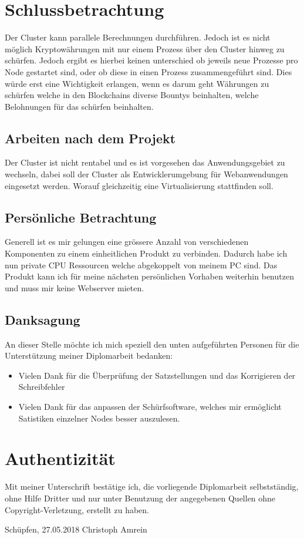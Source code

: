 \section{Schlussbetrachtung} 
\label{sec:Schlussbetrachtung}
Der Cluster kann parallele Berechnungen durchführen. Jedoch ist es nicht möglich Kryptowährungen mit nur einem Prozess über den Cluster hinweg zu schürfen. Jedoch ergibt es hierbei keinen unterschied ob jeweils neue Prozesse pro Node gestartet sind, oder ob diese in einen Prozess zusammengeführt sind. Dies würde erst eine Wichtigkeit erlangen, wenn es darum geht Währungen zu schürfen welche in den Blockchains diverse Bountys beinhalten, welche Belohnungen für das schürfen beinhalten.

\subsection{Arbeiten nach dem Projekt}
Der Cluster ist nicht rentabel und es ist vorgesehen das Anwendungsgebiet zu wechseln, dabei soll der Cluster als Entwicklerumgebung für Webanwendungen eingesetzt werden. Worauf gleichzeitig eine Virtualisierung stattfinden soll.

\subsection{Persönliche Betrachtung}
Generell ist es mir gelungen eine grössere Anzahl von verschiedenen Komponenten zu einem einheitlichen Produkt zu verbinden. Dadurch habe ich nun private CPU Ressourcen welche abgekoppelt von meinem PC sind. Das Produkt kann ich für meine nächsten persönlichen Vorhaben weiterhin benutzen und muss mir keine Webserver mieten.
 
\subsection{Danksagung}
An dieser Stelle möchte ich mich speziell den unten aufgeführten Personen für die Unterstützung meiner Diplomarbeit bedanken:

\begin{itemize} 
	\item Vielen Dank für die Überprüfung der Satzstellungen und das Korrigieren der Schreibfehler
 \end{itemize}
 \begin{itemize} 
	\item Vielen Dank für das anpassen der Schürfsoftware, welches mir ermöglicht Satistiken einzelner Nodes besser auszulesen.
 \end{itemize}

\section{Authentizität}
Mit meiner Unterschrift bestätige ich, die vorliegende Diplomarbeit selbstständig, ohne Hilfe Dritter und nur unter Benutzung der angegebenen Quellen ohne Copyright-Verletzung, erstellt zu haben.

Schüpfen, 27.05.2018\newline
\newline
\newline
Christoph Amrein

